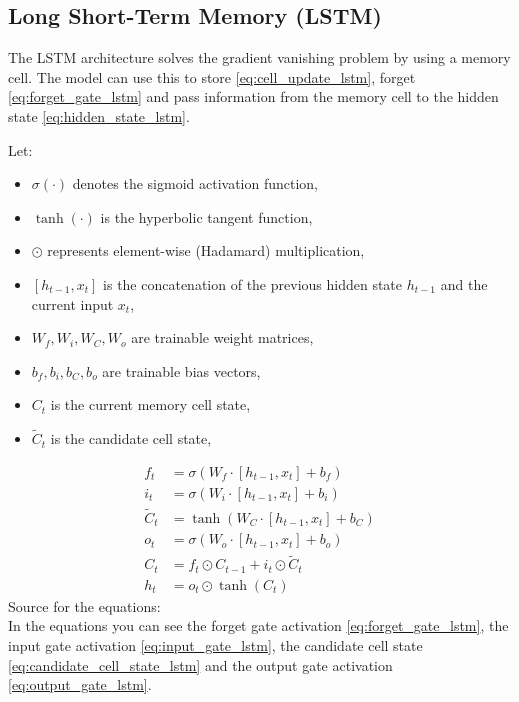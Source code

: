 \documentclass{article}
\begin{document}
\subsection{ Long Short-Term Memory (LSTM)}
The LSTM architecture solves the gradient vanishing problem by using a memory 
cell. The model can use this to store \eqref{eq:cell_update_lstm}, forget 
\eqref{eq:forget_gate_lstm} and pass information from the 
memory cell to the hidden state \eqref{eq:hidden_state_lstm}.

Let: 
\begin{itemize}
    \item $\sigma(\cdot)$ denotes the sigmoid activation function,
    \item $\tanh(\cdot)$ is the hyperbolic tangent function,
    \item $\odot$ represents element-wise (Hadamard) multiplication,
    \item $[h_{t-1}, x_t]$ is the concatenation of the previous hidden state $h_{t-1}$ and the current input $x_t$,
    \item $W_f, W_i, W_C, W_o$ are trainable weight matrices,
    \item $b_f, b_i, b_C, b_o$ are trainable bias vectors,
    \item $C_t$ is the current memory cell state,
    \item $\tilde{C}_t$ is the candidate cell state,
\end{itemize}

\begin{align}
    f_t &= \sigma\!\left(W_f \cdot [h_{t-1}, x_t] + b_f\right) \label{eq:forget_gate_lstm} \\
    i_t &= \sigma\!\left(W_i \cdot [h_{t-1}, x_t] + b_i\right) \label{eq:input_gate_lstm} \\
    \tilde{C}_t &= \tanh\!\left(W_C \cdot [h_{t-1}, x_t] + b_C\right) \label{eq:candidate_cell_state_lstm} \\
    o_t &= \sigma\!\left(W_o \cdot [h_{t-1}, x_t] + b_o\right) \label{eq:output_gate_lstm}\\    
    C_t &= f_t \odot C_{t-1} + i_t \odot \tilde{C}_t \label{eq:cell_update_lstm}\\
    h_t &= o_t \odot \tanh(C_t) \label{eq:hidden_state_lstm}
\end{align}
Source for the equations: \cite{geeksforgeeks_lstm}
\\[2em]
In the equations you can see the forget gate activation \eqref{eq:forget_gate_lstm}, 
the input gate activation \eqref{eq:input_gate_lstm}, the candidate cell state 
\eqref{eq:candidate_cell_state_lstm} and the output gate activation \eqref{eq:output_gate_lstm}.
\end{document}
